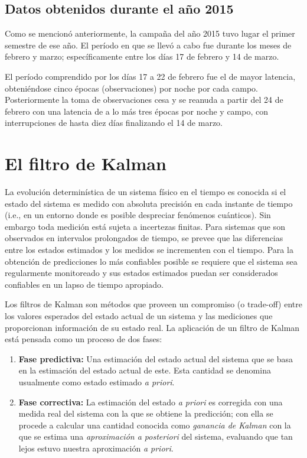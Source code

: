 \subsection{Datos obtenidos durante el a\~no 2015}\label{ssec:data}
Como se mencion\'o anteriormente, la campa\~na del a\~no 2015 tuvo lugar el primer semestre de ese a\~no. El per\'iodo en que se llev\'o a cabo fue durante los meses de febrero y marzo; espec\'ificamente entre los d\'ias 17 de febrero y 14 de marzo.
\bigskip

El per\'iodo comprendido por los d\'ias 17 a 22 de febrero fue el de mayor latencia, obteni\'endose cinco \'epocas (observaciones) por noche por cada campo. Posteriormente la toma de observaciones cesa y se reanuda a partir del 24 de febrero con una latencia de a lo m\'as tres \'epocas por noche y campo, con interrupciones de hasta diez d\'ias finalizando el 14 de marzo.

\section{El filtro de Kalman}
La evoluci\'on determin\'istica de un sistema f\'isico en el tiempo es conocida si el estado del sistema es medido con absoluta precisi\'on en cada instante de tiempo (i.e., en un entorno donde es posible despreciar fen\'omenos cu\'anticos). Sin embargo toda medici\'on est\'a sujeta a incertezas finitas. Para sistemas que son observados en intervalos prolongados de tiempo, se prevee que las diferencias entre los estados estimados y los medidos se incrementen con el tiempo. Para la obtenci\'on de predicciones lo m\'as confiables posible se requiere que el sistema sea regularmente monitoreado y sus estados estimados puedan ser considerados confiables en un lapso de tiempo apropiado. 
\bigskip

Los filtros de Kalman son m\'etodos que proveen un compromiso (o trade-off) entre los valores esperados del estado actual de un sistema y las mediciones que proporcionan informaci\'on de su estado real. La aplicaci\'on de un filtro de Kalman est\'a pensada como un proceso de dos fases:
\begin{enumerate}
\item \textbf{Fase predictiva:} Una estimaci\'on del estado actual del sistema que se basa en la estimaci\'on del estado actual de este. Esta cantidad se denomina usualmente como estado estimado \textit{a priori}. 
\item \textbf{Fase correctiva:} La estimaci\'on del estado \textit{a priori} es corregida con una medida real del sistema con la que se obtiene la predicci\'on; con ella se procede a calcular una cantidad conocida como \textit{ganancia de Kalman} con la que se estima una \textit{aproximaci\'on a posteriori} del sistema, evaluando que tan lejos estuvo nuestra aproximaci\'on \textit{a priori}. 
\end{enumerate}
\bigskip

